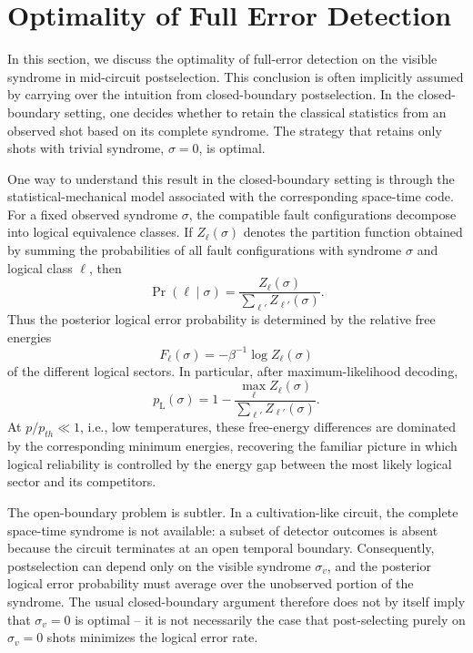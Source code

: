 \documentclass[
    reprint,
    amsmath,amssymb,
    nofootinbib,
    superscriptaddress,
    aps,
    noeprint,
    longbibliography,
    prl
]{revtex4-2}
\theoremstyle{plain}
\begin{document}
\FloatBarrier
\section{Optimality of Full Error Detection}
In this section, we discuss the optimality of full-error detection on the visible syndrome in
mid-circuit postselection. This conclusion is often implicitly assumed by carrying over the
intuition from closed-boundary postselection. In the closed-boundary setting, one decides whether to
retain the classical statistics from an observed shot based on its complete syndrome. The strategy
that retains only shots with trivial syndrome, $\sigma=0$, is optimal.

One way to understand this result in the closed-boundary setting is through the
statistical-mechanical model associated with the corresponding space-time code. For a fixed observed
syndrome $\sigma$, the compatible fault configurations decompose into logical equivalence classes.
If $Z_\ell(\sigma)$ denotes the partition function obtained by summing the probabilities of all
fault configurations with syndrome $\sigma$ and logical class $\ell$, then
\begin{equation}
    \Pr(\ell\mid \sigma)
    =
    \frac{Z_\ell(\sigma)}
    {\sum_{\ell'} Z_{\ell'}(\sigma)}.
\end{equation}
Thus the posterior logical error probability is determined by the relative free energies
\begin{equation}
    F_\ell(\sigma)=-\beta^{-1}\log Z_\ell(\sigma)
\end{equation}
of the different logical sectors. In particular, after maximum-likelihood decoding,
\begin{equation}
    p_{\mathrm L}(\sigma)
    =
    1-
    \frac{\max_\ell Z_\ell(\sigma)}
    {\sum_{\ell'}Z_{\ell'}(\sigma)}.
\end{equation}
At $p/p_{th} \ll 1$, i.e., low temperatures, these free-energy differences are dominated by the
corresponding minimum energies, recovering the familiar picture in which logical reliability is
controlled by the energy gap between the most likely logical sector and its competitors.

The open-boundary problem is subtler. In a cultivation-like circuit, the complete space-time
syndrome is not available: a subset of detector outcomes is absent because the circuit terminates at
an open temporal boundary. Consequently, postselection can depend only on the visible syndrome
$\sigma_v$, and the posterior logical error probability must average over the unobserved portion of
the syndrome. The usual closed-boundary argument therefore does not by itself imply that
$\sigma_v=0$ is optimal -- it is not necessarily the case that post-selecting purely on $\sigma_v =
0$ shots minimizes the logical error rate.
\end{document}
